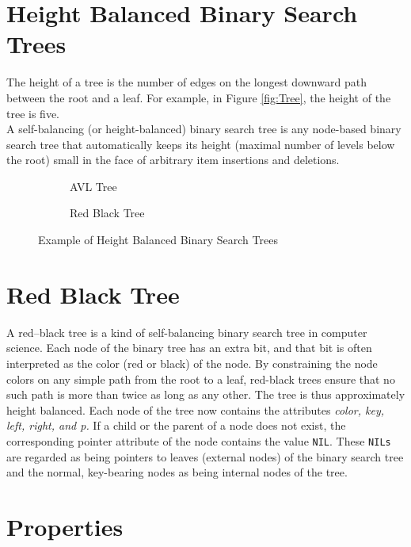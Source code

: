 \documentclass{article}[10pt]
\begin{document}
\section{Height Balanced Binary Search Trees}
The height of a tree is the number of edges on the longest downward path between the root and a leaf. For example, in Figure \ref{fig:Tree}, the height of the tree is five. \\
A self-balancing (or height-balanced) binary search tree is any node-based binary search tree that automatically keeps its height (maximal number of levels below the root) small in the face of arbitrary item insertions and deletions.

\begin{figure}[h!]
	\centering
	\begin{subfigure}{0.4\textwidth} %
		
		\caption{AVL Tree} %
	\end{subfigure}
	\vspace{1em} %
	\begin{subfigure}{0.4\textwidth} %
		
		\caption{Red Black Tree} %
	\end{subfigure}
	\caption{Example of Height Balanced Binary Search Trees} %
\end{figure}

\section{Red Black Tree}
A red–black tree is a kind of self-balancing binary search tree in computer science. Each node of the binary tree has an extra bit, and that bit is often interpreted as the color (red or black) of the node. 
By constraining the node colors on any simple path from the root to a leaf, red-black trees ensure that no such path is more than twice as long as any other. 
The tree is thus approximately height balanced.
Each node of the tree now contains the attributes
\textit{color, key, left, right, and p.} If
a child or the parent of a node does not exist, the corresponding pointer attribute of the node contains the value \texttt{NIL}. These \texttt{NILs} are regarded as being pointers to leaves (external nodes) of the binary search tree and the normal, key-bearing nodes as being internal nodes of the tree.


\section{Properties}
\end{document}
